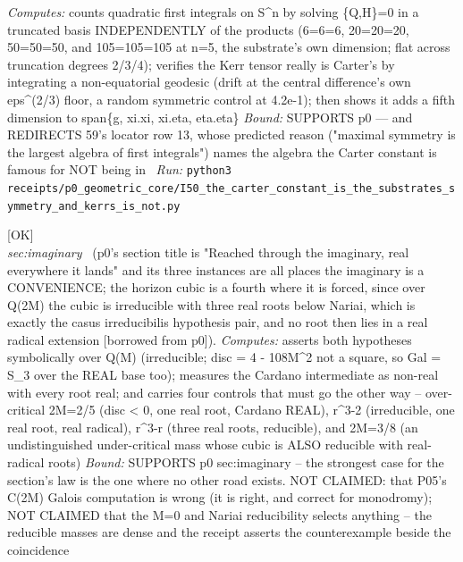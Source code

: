 \begin{description}
\emph{Computes:} counts quadratic first integrals on S\textasciicircum{}n by solving \{Q,H\}=0 in a truncated basis INDEPENDENTLY of the products (6=6=6, 20=20=20, 50=50=50, and 105=105=105 at n=5, the substrate's own dimension; flat across truncation degrees 2/3/4); verifies the Kerr tensor really is Carter's by integrating a non-equatorial geodesic (drift at the central difference's own eps\textasciicircum{}(2/3) floor, a random symmetric control at 4.2e-1); then shows it adds a fifth dimension to span\{g, xi.xi, xi.eta, eta.eta\}
 \emph{Bound:} SUPPORTS p0 --- and REDIRECTS 59's locator row 13, whose predicted reason ("maximal symmetry is the largest algebra of first integrals") names the algebra the Carter constant is famous for NOT being in
\ \emph{Run:} \texttt{python3 receipts/p0\_geometric\_core/I50\_the\_carter\_constant\_is\_the\_substrates\_symmetry\_and\_kerrs\_is\_not.py}
\item[\label{rcpt:T50_the_imaginary_route_to_the_horizon_radii_is_forced_and_two_members_escape_it}\textbf{}\quad\texttt{T50\_the\_imaginary\_route\_to\_the\_horizon\_radii\_is\_forced\_and\_two\_members\_escape\_it}]\hfill\textsf{[OK]}\\
\textit{sec:imaginary} \ (p0's section title is "Reached through the imaginary, real everywhere it lands" and its three instances are all places the imaginary is a CONVENIENCE; the horizon cubic is a fourth where it is forced, since over Q(2M) the cubic is irreducible with three real roots below Nariai, which is exactly the casus irreducibilis hypothesis pair, and no root then lies in a real radical extension [borrowed from p0]). 
\emph{Computes:} asserts both hypotheses symbolically over Q(M) (irreducible; disc = 4 - 108M\textasciicircum{}2 not a square, so Gal = S\_3 over the REAL base too); measures the Cardano intermediate as non-real with every root real; and carries four controls that must go the other way -- over-critical 2M=2/5 (disc < 0, one real root, Cardano REAL), r\textasciicircum{}3-2 (irreducible, one real root, real radical), r\textasciicircum{}3-r (three real roots, reducible), and 2M=3/8 (an undistinguished under-critical mass whose cubic is ALSO reducible with real-radical roots)
 \emph{Bound:} SUPPORTS p0 sec:imaginary -- the strongest case for the section's law is the one where no other road exists. NOT CLAIMED: that P05's C(2M) Galois computation is wrong (it is right, and correct for monodromy); NOT CLAIMED that the M=0 and Nariai reducibility selects anything -- the reducible masses are dense and the receipt asserts the counterexample beside the coincidence

\end{description}
